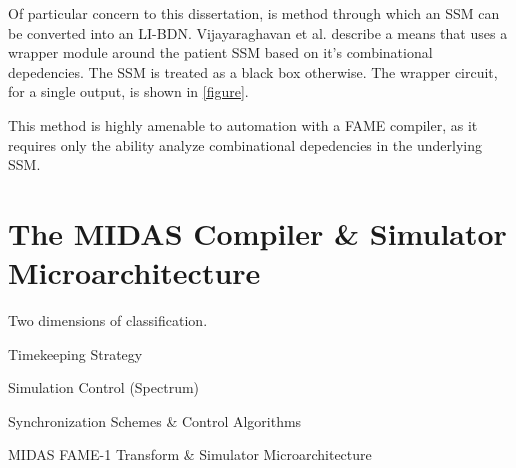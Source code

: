 Of particular concern to this dissertation, is method through which an SSM can
be converted into an LI-BDN.  Vijayaraghavan et al. describe a means that uses
a wrapper module around the patient SSM based on it's combinational
depedencies. The SSM is treated as a black box otherwise. The wrapper circuit,
for a single output, is shown in \ref{figure}.

This method is highly amenable to automation with a FAME compiler, as it requires
only the ability analyze combinational depedencies in the underlying SSM.

\section{The MIDAS Compiler \& Simulator Microarchitecture}



Two dimensions of classification.

Timekeeping Strategy

Simulation Control (Spectrum)

Synchronization Schemes \& Control Algorithms

MIDAS FAME-1 Transform \& Simulator Microarchitecture

